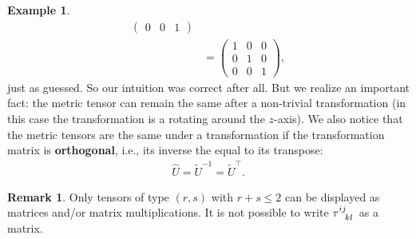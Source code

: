 \documentclass{book}
\theoremstyle{definition}
\newtheorem{rmk}{Remark}[section]
\newtheorem{exmp}{Example}[section]
\begin{document}
\begin{exmp}
\begin{align*}
\begin{pmatrix}
	0 & 0 & 1
	\end{pmatrix}\\
	&=
	\begin{pmatrix}
	1 & 0 & 0\\
	0 & 1 & 0\\
	0 & 0 & 1
	\end{pmatrix},
	\end{align*}
	just as guessed. So our intuition was correct after all. But we realize an important fact: the metric tensor can remain the same after a non-trivial transformation (in this case the transformation is a rotating around the $z$-axis). We also notice that the metric tensors are the same under a transformation if the transformation matrix is \textbf{orthogonal}, i.e., its inverse the equal to its transpose:
	\begin{align*}
	\hat{U} = \tilde{U}^{-1} = \tilde{U}^\top.
	\end{align*}
\end{exmp}

\begin{rmk}
	Only tensors of type $(r,s)$ with $r+s \leq 2$ can be displayed as matrices and/or matrix multiplications. It is not possible to write $\tensor{\tau}{^{ij}_{kl}}$ as a matrix. 
\end{rmk}
\end{document}
